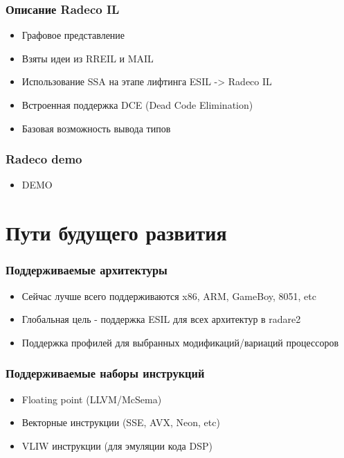 \documentclass[10pt,pdf,utf8,english,compress,hyperref={unicode}]{beamer}
\begin{document}
\begin{frame}[fragile]
  \frametitle{Описание Radeco IL}
     \begin{itemize}
        \item Графовое представление
		\item Взяты идеи из RREIL и MAIL
		\item Использование SSA на этапе лифтинга ESIL -> Radeco IL
		\item Встроенная поддержка DCE (Dead Code Elimination)
		\item Базовая возможность вывода типов 
      \end{itemize}
\end{frame}

\begin{frame}[fragile]
  \frametitle{Radeco demo}
     \begin{itemize}
        \item DEMO
      \end{itemize}
\end{frame}

\section{Пути будущего развития}

\begin{frame}[fragile]
  \frametitle{Поддерживаемые архитектуры}
     \begin{itemize}
        \item Сейчас лучше всего поддерживаются x86, ARM, GameBoy, 8051, etc
		\item Глобальная цель - поддержка ESIL для всех архитектур в radare2
		\item Поддержка профилей для выбранных модификаций/вариаций процессоров
      \end{itemize}
\end{frame}

\begin{frame}[fragile]
  \frametitle{Поддерживаемые наборы инструкций}
     \begin{itemize}
        \item Floating point (LLVM/McSema) 
		\item Векторные инструкции (SSE, AVX, Neon, etc)
		\item VLIW инструкции (для эмуляции кода DSP)
      \end{itemize}
\end{frame}
\end{document}
